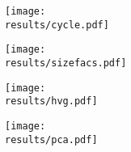 \documentclass{article}
\begin{document}
\newcommand{\results}{../../real/10X/pics}

\begin{figure}[btp]
    \begin{subfigure}[b]{0.49\textwidth}
        \texttt{[image: \\results/cycle.pdf]}
        \caption{}
    \end{subfigure}
    \begin{subfigure}[b]{0.49\textwidth}
        \texttt{[image: \\results/sizefacs.pdf]}
        \caption{}
    \end{subfigure}
    \begin{subfigure}[b]{0.49\textwidth}
        \texttt{[image: \\results/hvg.pdf]}
        \caption{}
    \end{subfigure}
    \begin{subfigure}[b]{0.49\textwidth}
        \texttt{[image: \\results/pca.pdf]}
        \caption{}
    \end{subfigure}
\end{figure}
\end{document}
